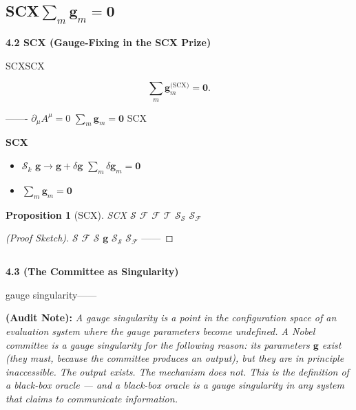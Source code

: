 \documentclass[12pt,a4paper]{article}
\newtheorem{proposition}[theorem]{Proposition}
\theoremstyle{remark}
\newcommand{\gaugeVec}{\mathbf{g}}
\newcommand{\sumgd}{\sum_m \mathbf{g}_m = \mathbf{0}}
\newcommand{\scoreOp}{\mathcal{S}}
\newcommand{\auditnote}[1]{%
    \medskip\noindent
    \textbf{ (Audit Note):} \textit{#1}%
}
\begin{document}
\subsection{SCX$\sumgd$ }

\noindent
\textbf{4.2 SCX (Gauge-Fixing in the SCX Prize)}

SCXSCX

\begin{equation}
    \boxed{\sum_m \mathbf{g}_m^{\text{(SCX)}} = \mathbf{0}}.
    \label{eq:gauge_fix}
\end{equation}

\textbf{}——\textit{}- $\partial_\mu A^\mu = 0$ $\sumgd$ SCX

\textbf{SCX}
\begin{itemize}
    \item  $\scoreOp_k$  $\gaugeVec \to \gaugeVec + \delta\gaugeVec$  $\sum_m \delta\mathbf{g}_m = \mathbf{0}$
    \item  $\sumgd$ 
\end{itemize}

\begin{proposition}[SCX]
\label{prop:scx_gauge_equiv}
SCX $\mathcal{S}$  $\mathcal{F}$ \textbf{} $\mathcal{F}$  $\mathcal{T}$ $\scoreOp_{\mathcal{S}}$  $\scoreOp_{\mathcal{F}}$ 
\end{proposition}

\begin{proof}[ (Proof Sketch)]
$\mathcal{S}$  $\mathcal{F}$  $\mathcal{S}$  $\gaugeVec$  $\scoreOp_{\mathcal{S}}$  $\scoreOp_{\mathcal{F}}$ ——\textit{}
\end{proof}

\subsection{}

\noindent
\textbf{4.3  (The Committee as Singularity)}

\textbf{}gauge singularity——

\auditnote{A gauge singularity is a point in the configuration space of an evaluation system where the gauge parameters become undefined. A Nobel committee is a gauge singularity for the following reason: its parameters $\gaugeVec$ exist (they must, because the committee produces an output), but they are in principle inaccessible. The output exists. The mechanism does not. This is the definition of a black-box oracle — and a black-box oracle is a gauge singularity in any system that claims to communicate information.}
\end{document}
